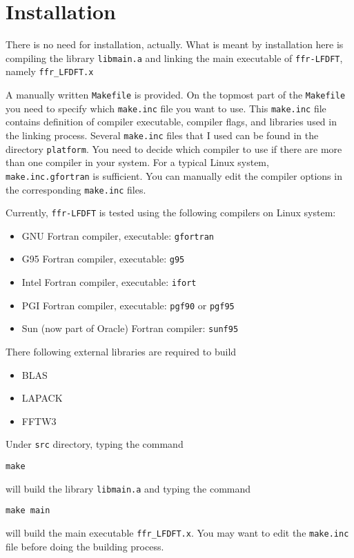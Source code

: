 \section{Installation}

There is no need for installation, actually.
What is meant by installation here is compiling the library
{\tt libmain.a} and
linking the main executable of {\tt ffr-LFDFT}, namely
{\tt ffr\_LFDFT.x}

A manually written {\tt Makefile} is provided. On the topmost part of the
{\tt Makefile} you need to specify which {\tt make.inc} file you
want to use.
This {\tt make.inc} file contains definition of compiler executable,
compiler flags, and libraries used in the linking process.
Several {\tt make.inc} files that I used can be found in
the directory {\tt platform}.
You need to decide which compiler to use if there
are more than one compiler in your system.
For a typical Linux system, {\tt make.inc.gfortran} is sufficient.
You can manually edit the compiler options in the corresponding {\tt make.inc}
files.

Currently, {\tt ffr-LFDFT} is tested using the following compilers
on Linux system:
\begin{itemize}
\item GNU Fortran compiler, executable: {\tt gfortran}
\item G95 Fortran compiler, executable: {\tt g95}
\item Intel Fortran compiler, executable: {\tt ifort}
\item PGI Fortran compiler, executable: {\tt pgf90} or {\tt pgf95}
\item Sun (now part of Oracle) Fortran compiler: {\tt sunf95}
\end{itemize}

There following external libraries are required to build \ffrLFDFT
\begin{itemize}
\item BLAS
\item LAPACK
\item FFTW3
\end{itemize}

Under \texttt{src} directory, typing the command
\begin{verbatim}
make
\end{verbatim}
will build the library {\tt libmain.a} and typing
the command
\begin{verbatim}
make main
\end{verbatim}
will build the main executable {\tt ffr\_LFDFT.x}.
You may want to edit the \texttt{make.inc} file before doing the building process.






